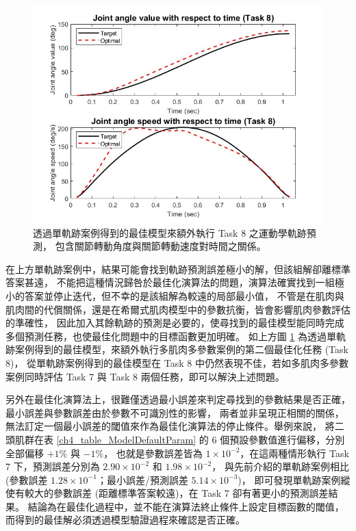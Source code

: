 \begin{figure}[!ht]
	\centering
	\includegraphics[width=13cm]{figure/ch5_fig_CaseE_BICs_Opt_8.JPG}
    \caption[單軌跡案例於 Task 8 之運動軌跡預測]{透過單軌跡案例得到的最佳模型來額外執行 Task 8 之運動學軌跡預測，
                                             包含關節轉動角度與關節轉動速度對時間之關係。}
    \label{ch5_fig_CaseE_BICs_8}
\end{figure}

\clearpage

在上方單軌跡案例中，結果可能會找到軌跡預測誤差極小的解，但該組解卻離標準答案甚遠，
不能把這種情況歸咎於最佳化演算法的問題，演算法確實找到一組極小的答案並停止迭代，但不幸的是該組解為較遠的局部最小值，
不管是在肌肉與肌肉間的代償關係，還是在希爾式肌肉模型中的參數抗衡，皆會影響肌肉參數評估的準確性，
因此加入其餘軌跡的預測是必要的，使尋找到的最佳模型能同時完成多個預測任務，也使最佳化問題中的目標函數更加明確。
如上方圖 \ref{ch5_fig_CaseE_BICs_8} 為透過單軌跡案例得到的最佳模型，來額外執行多肌肉多參數案例的第二個最佳化任務 (Task 8)，
從單軌跡案例得到的最佳模型在 Task 8 中仍然表現不佳，若如多肌肉多參數案例同時評估 Task 7 與 Task 8 兩個任務，即可以解決上述問題。 

另外在最佳化演算法上，很難僅透過最小誤差來判定尋找到的參數結果是否正確，最小誤差與參數誤差由於參數不可識別性的影響，
兩者並非呈現正相關的關係，無法訂定一個最小誤差的閾值來作為最佳化演算法的停止條件。舉例來說，
將二頭肌群在表 \ref{ch4_table_ModelDefaultParam} 的 6 個預設參數值進行偏移，分別全部偏移 $+ 1\%$ 與 $- 1\%$，
也就是參數誤差皆為 $1 \times 10^{-2}$，在這兩種情形執行 Task 7 下，預測誤差分別為 $2.90 \times 10^{-2}$ 和 $1.98 \times 10^{-2}$，
與先前介紹的單軌跡案例相比 (參數誤差 $1.28 \times 10^{-1}$；最小誤差/預測誤差 $5.14 \times 10^{-3}$)，
即可發現單軌跡案例縱使有較大的參數誤差 (距離標準答案較遠)，在 Task 7 卻有著更小的預測誤差結果。
結論為在最佳化過程中，並不能在演算法終止條件上設定目標函數的閾值，而得到的最佳解必須透過模型驗證過程來確認是否正確。

